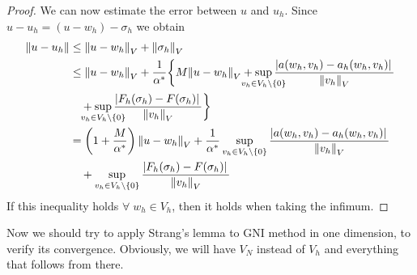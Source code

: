 \begin{proof}
    We can now estimate the error between \(u\) and \(u_h\). Since \(u-u_h = (u-w_h) - \sigma_h\) we obtain
    \begin{align*}
        \norm{u-u_h} &\leq  \norm{u-w_h}_V + \norm{\sigma_h}_V \\
        &\leq \norm{u-w_h}_V + \frac{1}{\alpha^*} \bigg\{M\norm{u-w_h}_V + \sup_{\mathclap{v_h \in V_h \backslash \left\{0\right\}}} \frac{\abs*{a(w_h, v_h) - a_h(w_h, v_h)}}{\norm{v_h}_V}  \\
        & \quad + \sup_{\mathclap{v_h \in V_h \backslash \left\{0\right\}}} \frac{\abs*{F_h(\sigma_h)-F(\sigma_h)}}{\norm{v_h}_V}\bigg\} \\
        &= \left(1+\frac{M}{\alpha^*}\right)\norm{u-w_h}_V + \frac{1}{\alpha^*} \sup_{v_h \in V_h \backslash \left\{0\right\}} \frac{\abs*{a(w_h, v_h) - a_h(w_h, v_h)}}{\norm{v_h}_V} \\
        &\quad + \sup_{v_h \in V_h \backslash \left\{0\right\}}\frac{\abs*{F_h(\sigma_h)-F(\sigma_h)}}{\norm{v_h}_V}
    \end{align*}
    If this inequality holds \(\forall \; w_h \in V_h\), then it holds when taking the infimum.
\end{proof}
Now we should try to apply Strang's lemma to GNI method in one dimension, to verify its convergence. Obviously, we will have \(V_N\) instead of \(V_h\) and everything that follows from there.

